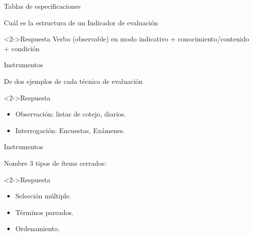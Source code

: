 \documentclass[11pt, aspectratio=169, xcolor=table,hyphens]{beamer}
\begin{document}
\begin{frame}{Tablas de especificaciones}
	\begin{center}
		Cuál es la estructura de un Indicador de evaluación
	\end{center}
	\begin{block}<2->{Respuesta}
		Verbo (observable) en modo indicativo + conocimiento/contenido + condición
		\begin{flushright}
			\cite{WESTED2021}
		\end{flushright}
	\end{block}
\end{frame}

\begin{frame}{Instrumentos}
	\begin{center}
		De dos ejemplos de cada técnica de evaluación
	\end{center}
	\begin{block}<2->{Respuesta}
		\begin{itemize}[<2->]
			\item Observación: listas de cotejo, diarios.
			\item Interrogación: Encuestas, Exámenes.
		\end{itemize}
		\begin{flushright}
			\cite{CASTILLO2010}
		\end{flushright}
	\end{block}

\end{frame}

\begin{frame}{Instrumentos}
	\begin{center}
		Nombre 3 tipos de ítems cerrados:
	\end{center}
	\begin{block}<2->{Respuesta}
		\begin{itemize}[<2->]
			\item Selección múltiple.
			\item Términos pareados.
			\item Ordenamiento.
		\end{itemize}
		\begin{flushright}
			\cite{MIDE2021}
		\end{flushright}
	\end{block}
\end{frame}
\end{document}
